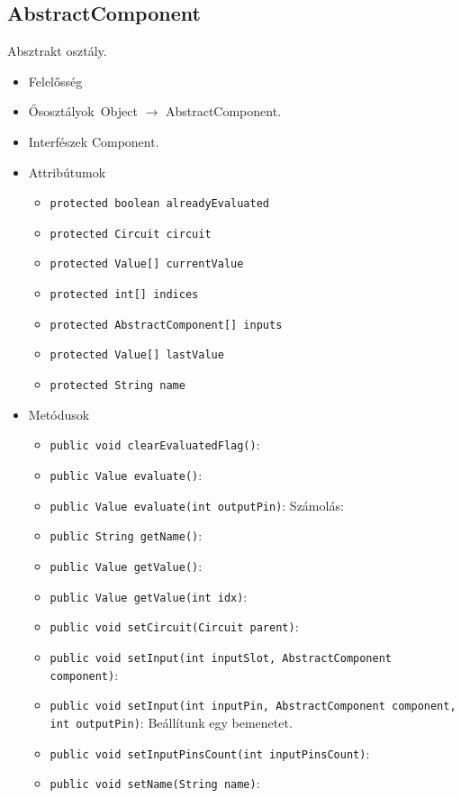 \subsection{AbstractComponent}
Absztrakt osztály.
\begin{itemize}
\item Felelősség\\

\item Ősosztályok\ Object $\rightarrow{}$ AbstractComponent.
\item Interfészek Component.
\item Attribútumok $\ $
\begin{itemize}
	\item \texttt{protected boolean alreadyEvaluated} 
	\item \texttt{protected Circuit circuit} 
	\item \texttt{protected Value[] currentValue} 
	\item \texttt{protected int[] indices} 
	\item \texttt{protected AbstractComponent[] inputs} 
	\item \texttt{protected Value[] lastValue} 
	\item \texttt{protected String name} 
\end{itemize}
\item Metódusok$\ $
\begin{itemize}
	\item \texttt{public void clearEvaluatedFlag()}: 
	\item \texttt{public Value evaluate()}: 
	\item \texttt{public Value evaluate(int outputPin)}: Számolás:
	\item \texttt{public String getName()}: 
	\item \texttt{public Value getValue()}: 
	\item \texttt{public Value getValue(int idx)}: 
	\item \texttt{public void setCircuit(Circuit parent)}: 
	\item \texttt{public void setInput(int inputSlot, AbstractComponent component)}: 
	\item \texttt{public void setInput(int inputPin, AbstractComponent component, int outputPin)}: Beállítunk egy bemenetet.
	\item \texttt{public void setInputPinsCount(int inputPinsCount)}: 
	\item \texttt{public void setName(String name)}: 
\end{itemize}
\end{itemize}

